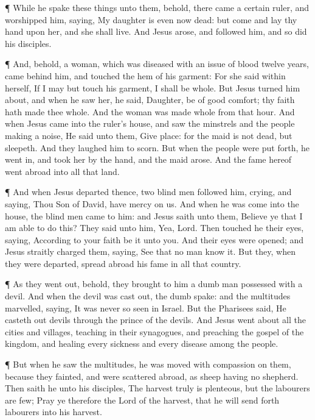  ¶ While he spake these things unto them, behold, there
came a certain ruler, and worshipped him, saying, My daughter is even
now dead: but come and lay thy hand upon her, and she shall live.
 And Jesus arose, and followed him, and so did his
disciples.

 ¶ And, behold, a woman, which was diseased with an issue
of blood twelve years, came behind him, and touched the hem of his
garment:  For she said within herself, If I may but touch
his garment, I shall be whole.  But Jesus turned him about,
and when he saw her, he said, Daughter, be of good comfort; thy faith
hath made thee whole. And the woman was made whole from that hour.
 And when Jesus came into the ruler's house, and saw the
minstrels and the people making a noise,  He said unto
them, Give place: for the maid is not dead, but sleepeth. And they
laughed him to scorn.  But when the people were put forth,
he went in, and took her by the hand, and the maid arose. 
And the fame hereof went abroad into all that land.

 ¶ And when Jesus departed thence, two blind men followed
him, crying, and saying, Thou Son of David, have mercy on us.
 And when he was come into the house, the blind men came to
him: and Jesus saith unto them, Believe ye that I am able to do this?
They said unto him, Yea, Lord.  Then touched he their eyes,
saying, According to your faith be it unto you.  And their
eyes were opened; and Jesus straitly charged them, saying, See that no
man know it.  But they, when they were departed, spread
abroad his fame in all that country.

 ¶ As they went out, behold, they brought to him a dumb man
possessed with a devil.  And when the devil was cast out,
the dumb spake: and the multitudes marvelled, saying, It was never so
seen in Israel.  But the Pharisees said, He casteth out
devils through the prince of the devils.  And Jesus went
about all the cities and villages, teaching in their synagogues, and
preaching the gospel of the kingdom, and healing every sickness and
every disease among the people.

 ¶ But when he saw the multitudes, he was moved with
compassion on them, because they fainted, and were scattered abroad, as
sheep having no shepherd.  Then saith he unto his
disciples, The harvest truly is plenteous, but the labourers are few;
 Pray ye therefore the Lord of the harvest, that he will
send forth labourers into his harvest.

